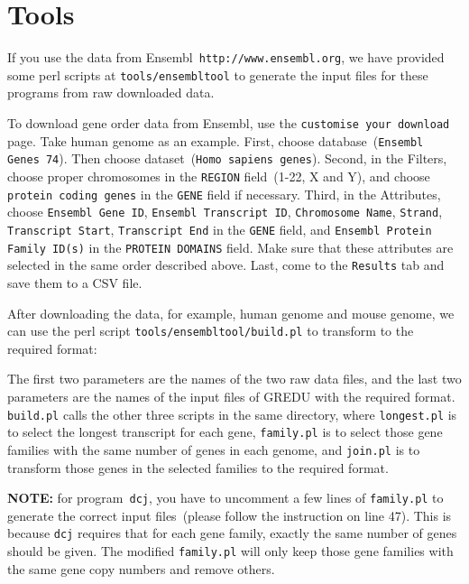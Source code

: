 \documentclass[11pt, a4paper]{article}
\begin{document}
\section{Tools}
If you use the data from Ensembl~\texttt{http://www.ensembl.org}, we have provided
some perl scripts at \texttt{tools/ensembltool} to generate the input files for
these programs from raw downloaded data.

To download gene order data from Ensembl, use the \texttt{customise your download} page.
Take human genome as an example.  First, choose database~(\texttt{Ensembl Genes 74}).  
Then choose dataset~(\texttt{Homo sapiens genes}).  
Second, in the Filters, choose proper chromosomes in the \texttt{REGION} field~(1-22, X and Y),
and choose \texttt{protein coding genes} in the \texttt{GENE} field if necessary.  
Third, in the Attributes, choose \texttt{Ensembl Gene ID}, \texttt{Ensembl Transcript ID},
\texttt{Chromosome Name}, \texttt{Strand}, \texttt{Transcript Start},
\texttt{Transcript End} in the \texttt{GENE} field, and \texttt{Ensembl Protein Family ID(s)}
in the \texttt{PROTEIN DOMAINS} field.  Make sure that these attributes are selected in the same order described above.
Last, come to the \texttt{Results} tab and save them to a CSV file.

After downloading the data, for example, human genome and mouse genome, we can
use the perl script \texttt{tools/ensembltool/build.pl} to transform to the required format:


The first two parameters are the names of the two raw data files, and the last two
parameters are the names of the input files of GREDU with the required
format.  \texttt{build.pl} calls the other three scripts in the
same directory, where \texttt{longest.pl} is to select the
longest transcript for each gene, \texttt{family.pl} is to select
those gene families with the same number of genes in each genome, and
\texttt{join.pl} is to transform those genes in the selected families
to the required format.

{\bf NOTE:} for program~\texttt{dcj}, you have to uncomment a few lines of \texttt{family.pl}
to generate the correct input files~(please follow the instruction on line 47).
This is because \texttt{dcj} requires that for each gene family, exactly the
same number of genes should be given. The modified \texttt{family.pl} will
only keep those gene families with the same gene copy numbers and remove others.



\end{document}
